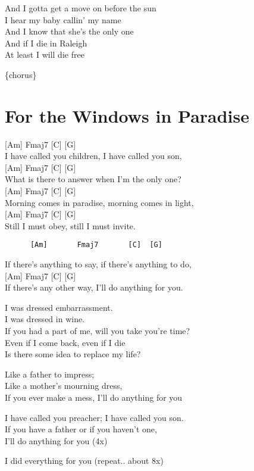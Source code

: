 \documentclass[
  letterpaper,
  DIV=11,
  numbers=noendperiod]{scrreprt}
\begin{document}
And I gotta get a move on before the sun\\
I hear my baby callin' my name\\
And I know that she's the only one\\
And if I die in Raleigh\\
At least I will die free

\{chorus\}

\hypertarget{for-the-windows-in-paradise}{%
\chapter{For the Windows in
Paradise}\label{for-the-windows-in-paradise}}

{[}Am{]} Fmaj7 {[}C{]} {[}G{]}\\
I have called you children, I have called you son,\\
{[}Am{]} Fmaj7 {[}C{]} {[}G{]}\\
What is there to answer when I'm the only one?\\
{[}Am{]} Fmaj7 {[}C{]} {[}G{]}\\
Morning comes in paradise, morning comes in light,\\
{[}Am{]} Fmaj7 {[}C{]} {[}G{]}\\
Still I must obey, still I must invite.

\begin{verbatim}
      [Am]       Fmaj7       [C]  [G]
\end{verbatim}

If there's anything to say, if there's anything to do,\\
{[}Am{]} Fmaj7 {[}C{]} {[}G{]}\\
If there's any other way, I'll do anything for you.

I was dressed embarrassment.\\
I was dressed in wine.\\
If you had a part of me, will you take you're time?\\
Even if I come back, even if I die\\
Is there some idea to replace my life?

Like a father to impress;\\
Like a mother's mourning dress,\\
If you ever make a mess, I'll do anything for you

I have called you preacher; I have called you son.\\
If you have a father or if you haven't one,\\
I'll do anything for you (4x)

I did everything for you (repeat.. about 8x)
\end{document}
